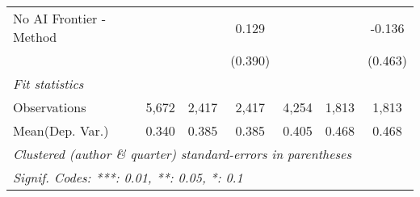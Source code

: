 \begin{tabular}{lcccccc}
   No AI Frontier - Method &               &         & 0.129          &               &               & -0.136\\   
                           &               &         & (0.390)        &               &               & (0.463)\\   
   \midrule
   \emph{Fit statistics}\\
   Observations            & 5,672         & 2,417   & 2,417          & 4,254         & 1,813         & 1,813\\  
Mean(Dep. Var.) & 0.340 & 0.385 & 0.385 & 0.405 & 0.468 & 0.468 \\
   \midrule \midrule
   \multicolumn{7}{l}{\emph{Clustered (author \& quarter) standard-errors in parentheses}}\\
   \multicolumn{7}{l}{\emph{Signif. Codes: ***: 0.01, **: 0.05, *: 0.1}}\\
\end{tabular}
\par\endgroup
